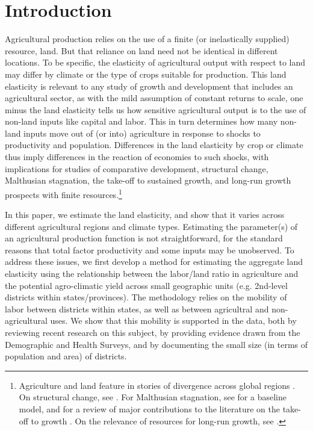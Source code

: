 \documentclass[11pt]{article}
\begin{document}
\pagebreak 

\section{Introduction}
\onehalfspacing 
Agricultural production relies on the use of a finite (or inelastically supplied) resource, land. But that reliance on land need not be identical in different locations. To be specific, the elasticity of agricultural output with respect to land may differ by climate or the type of crops suitable for production. This land elasticity is relevant to any study of growth and development that includes an agricultural sector, as with the mild assumption of constant returns to scale, one minus the land elasticity tells us how sensitive agricultural output is to the use of non-land inputs like capital and labor. This in turn determines how many non-land inputs move out of (or into) agriculture in response to shocks to productivity and population. Differences in the land elasticity by crop or climate thus imply differences in the reaction of economies to such shocks, with implications for studies of comparative development, structural change, Malthusian stagnation, the take-off to sustained growth, and long-run growth prospects with finite resources.\footnote{Agriculture and land feature in stories of divergence across global regions \citep{kp2001,galor2008trading,vollrath2011,vv08,vv13,cs2015}. On structural change, see \cite{Gollin:2007oq,Restuccia:2008hc,weilwilde2009,Gollin:2010ys,ev2016clim}. For Malthusian stagnation, see \cite{ashraf2010dynamics} for a baseline model, and \citet{Galor:2011uq} for a review of major contributions to the literature on the take-off to growth \citep{gw00,galor2002natural,Hansen:2002fk,doepke2004accounting,cs2005,lagerlof2006,craftsmills2009,strulik2008population}. On the relevance of resources for long-run growth, see \cite{perettovalente2015}.} 

In this paper, we estimate the land elasticity, and show that it varies across different agricultural regions and climate types. Estimating the parameter(s) of an agricultural production function is not straightforward, for the standard reasons that total factor productivity and some inputs may be unobserved. To address these issues, we first develop a method for estimating the aggregate land elasticity using the relationship between the labor/land ratio in agriculture and the potential agro-climatic yield across small geographic units (e.g. 2nd-level districts within states/provinces). The methodology relies on the mobility of labor between districts within states, as well as between agricultral and non-agricultural uses. We show that this mobility is supported in the data, both by reviewing recent research on this subject, by providing evidence drawn from the Demographic and Health Surveys, and by documenting the small size (in terms of population and area) of districts.
\end{document}
